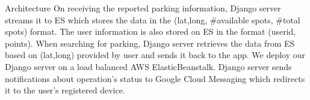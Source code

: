 \documentclass[final]{beamer}
\newlength{\onecolwid}
\begin{document}
\begin{frame}[t]
\begin{columns}[t]
\begin{column}{\onecolwid}
\begin{block}{Architecture}
On receiving the reported parking information, Django server streams it to ES which stores the data in the (lat,long, \#available spots, \#total spots) format. The user information is also stored on ES in the format (userid, points). When searching for parking, Django server retrieves the data from ES based on (lat,long) provided by user and sends it back to the app. We deploy our Django server on a load balanced AWS ElasticBeanstalk. Django server sends notifications about operation's status to Google Cloud Messaging which redirects it to the user's registered device.




\end{block}


\begin{figure}

\end{figure}
\end{column}
\end{columns}
\end{frame}
\end{document}
